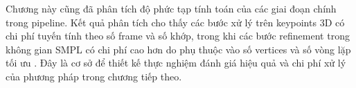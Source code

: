 \documentclass[../DoAn.tex]{subfiles}
\begin{document}
Chương này cũng đã phân tích độ phức tạp tính toán của các giai đoạn chính trong pipeline. Kết quả phân tích cho thấy các bước xử lý trên keypoints 3D có chi phí tuyến tính theo số frame và số khớp, trong khi các bước refinement trong không gian SMPL có chi phí cao hơn do phụ thuộc vào số vertices và số vòng lặp tối ưu \cite{smpl2015,smplify2016,yang2025learnable}. Đây là cơ sở để thiết kế thực nghiệm đánh giá hiệu quả và chi phí xử lý của phương pháp trong chương tiếp theo.
\end{document}
